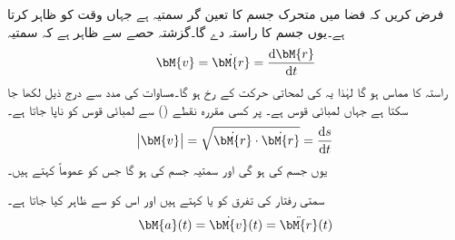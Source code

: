فرض کریں کہ فضا میں متحرک جسم  کا تعین گر سمتیہ  ہے جہاں  وقت کو ظاہر کرتا ہے۔یوں  جسم  کا راستہ  دے گا۔گزشتہ حصے سے ظاہر ہے کہ سمتیہ
\begin{align}
\bM{v}=\dot{\bM{r}}=\frac{\dif \bM{r}}{\dif t}
\end{align} 
راستہ  کا مماس ہو گا لہٰذا یہ  کی لمحاتی حرکت کے رخ ہو گا۔مساوات  کی مدد سے درج ذیل لکھا جا سکتا ہے  جہاں  لمبائی قوس ہے۔ پر کسی مقررہ نقطے () سے لمبائی قوس  کو  ناپا جاتا ہے۔
\begin{align}
\abs{\bM{v}}=\sqrt{\dot{\bM{r}}\cdot \dot{\bM{r}}}=\frac{\dif s}{\dif t}
\end{align}
یوں  جسم  کی  ہو گی اور سمتیہ  جسم  کی  ہو گا جس کو عموماً  کہتے ہیں۔

سمتی رفتار کی تفرق کو  یا  کہتے ہیں اور اس کو   سے ظاہر کیا جاتا ہے۔
\begin{align}
\bM{a}(t)=\dot{\bM{v}}(t)=\ddot{\bM{r}}(t)
\end{align} 

